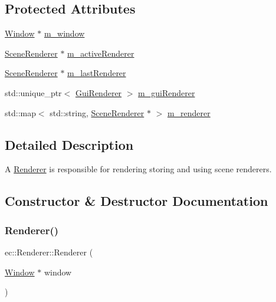 \subsection*{Protected Attributes}
\begin{DoxyCompactItemize}
\item 
\mbox{\hyperlink{classec_1_1_window}{Window}} $\ast$ \mbox{\hyperlink{classec_1_1_renderer_ac23d74f9d295bf833f095bdff8c8169b}{m\+\_\+window}}
\item 
\mbox{\hyperlink{classec_1_1_scene_renderer}{Scene\+Renderer}} $\ast$ \mbox{\hyperlink{classec_1_1_renderer_a00afed952025d62a654a5f961a55b342}{m\+\_\+active\+Renderer}}
\item 
\mbox{\hyperlink{classec_1_1_scene_renderer}{Scene\+Renderer}} $\ast$ \mbox{\hyperlink{classec_1_1_renderer_a818d84064fde8088d28358f7ea04f898}{m\+\_\+last\+Renderer}}
\item 
std\+::unique\+\_\+ptr$<$ \mbox{\hyperlink{classec_1_1_gui_renderer}{Gui\+Renderer}} $>$ \mbox{\hyperlink{classec_1_1_renderer_ac5969cd9baf68b5a3a02535bc9e9dd07}{m\+\_\+gui\+Renderer}}
\item 
std\+::map$<$ std\+::string, \mbox{\hyperlink{classec_1_1_scene_renderer}{Scene\+Renderer}} $\ast$ $>$ \mbox{\hyperlink{classec_1_1_renderer_ac3f0c1c3253fbac0f734af313cc410a4}{m\+\_\+renderer}}
\end{DoxyCompactItemize}


\subsection{Detailed Description}
A \mbox{\hyperlink{classec_1_1_renderer}{Renderer}} is responsible for rendering storing and using scene renderers. 

\subsection{Constructor \& Destructor Documentation}
\mbox{\label{classec_1_1_renderer_a97bc5e3d5050aa98a24fec3669eab28b}} 
\subsubsection{\texorpdfstring{Renderer()}{Renderer()}}
{\footnotesize\ttfamily ec\+::\+Renderer\+::\+Renderer (\begin{DoxyParamCaption}\item[{\mbox{\hyperlink{classec_1_1_window}{Window}} $\ast$}]{window }\end{DoxyParamCaption})\hspace{0.3cm}{\ttfamily [explicit]}}



